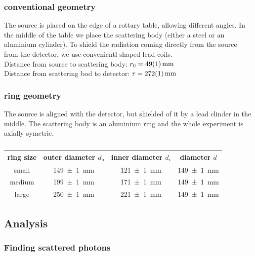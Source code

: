 \documentclass[a4paper,12pt]{article}
\begin{document}
\subsubsection{conventional geometry}
The source is placed on the edge of a rottary table, allowing different angles. In the middle of the table we place the scattering body (either a steel or an aluminium cylinder). To shield the radiation coming directly from the source from the detector, we use convenientl shaped lead coils.\\
Distance from source to scattering body: $r_0 = \SI{49+-1}{mm}$\\
Distance from scattering bod to detector: $r = \SI{272+-1}{mm}$\\

\subsubsection{ring geometry}
The source is aligned with the detector, but shielded of it by a lead clinder in the middle. The scattering body is an aluminium ring and the whole experiment is axially symetric.

\begin{table}[H]
	\renewcommand{\arraystretch}{1.5}
	\centering
	\begin{tabular}{|c|c|c|c|}
		\hline
		ring size & outer diameter $d_o$ & inner diameter $d_i$ & diameter $d$ \\
		\hline
		small & \SI{149+-1}{mm} & \SI{121+-1}{mm} & \SI{149+-1}{mm} \\
		\hline
		medium & \SI{199+-1}{mm} & \SI{171+-1}{mm} & \SI{149+-1}{mm} \\
		\hline
		large & \SI{250+-1}{mm} & \SI{221+-1}{mm} & \SI{149+-1}{mm} \\
		\hline
	\end{tabular}
	\caption{ }
	\label{tab:probes }
\end{table}

\subsection{Analysis}

\subsubsection{Finding scattered photons}
\end{document}
